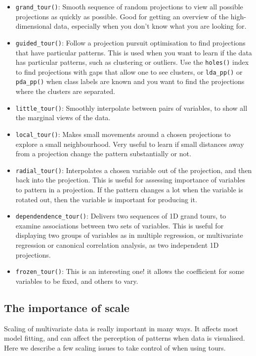 \documentclass[
  letterpaper,
]{krantz}
\providecommand{\tightlist}{%
  \setlength{\itemsep}{0pt}\setlength{\parskip}{0pt}}\usepackage{longtable,booktabs,array}
\begin{document}
\begin{itemize}
\tightlist
\item
  \texttt{grand\_tour()}: Smooth sequence of random projections to view
  all possible projections as quickly as possible. Good for getting an
  overview of the high-dimensional data, especially when you don't know
  what you are looking for.
\item
  \texttt{guided\_tour()}: Follow a projection pursuit optimisation to
  find projections that have particular patterns. This is used when you
  want to learn if the data has particular patterns, such as clustering
  or outliers. Use the \texttt{holes()} index to find projections with
  gaps that allow one to see clusters, or \texttt{lda\_pp()} or
  \texttt{pda\_pp()} when class labels are known and you want to find
  the projections where the clusters are separated.
\item
  \texttt{little\_tour()}: Smoothly interpolate between pairs of
  variables, to show all the marginal views of the data.
\item
  \texttt{local\_tour()}: Makes small movements around a chosen
  projections to explore a small neighbourhood. Very useful to learn if
  small distances away from a projection change the pattern
  substantially or not.
\item
  \texttt{radial\_tour()}: Interpolates a chosen variable out of the
  projection, and then back into the projection. This is useful for
  assessing importance of variables to pattern in a projection. If the
  pattern changes a lot when the variable is rotated out, then the
  variable is important for producing it.
\item
  \texttt{dependendence\_tour()}: Delivers two sequences of 1D grand
  tours, to examine associations between two sets of variables. This is
  useful for displaying two groups of variables as in multiple
  regression, or multivariate regression or canonical correlation
  analysis, as two independent 1D projections.
\item
  \texttt{frozen\_tour()}: This is an interesting one! it allows the
  coefficient for some variables to be fixed, and others to vary.
\end{itemize}

\subsection{The importance of scale}\label{the-importance-of-scale}

Scaling of multivariate data is really important in many ways. It
affects most model fitting, and can affect the perception of patterns
when data is visualised. Here we describe a few scaling issues to take
control of when using tours.
\end{document}
